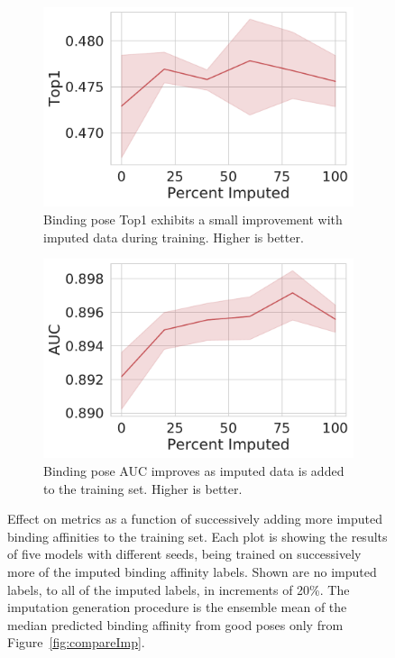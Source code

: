 \documentclass[journal=jmcmar,manuscript=article]{achemso}
\begin{document}
\begin{figure}[tbph]
    \begin{subfigure}[t]{0.48\textwidth}
        \centering
        \includegraphics[width=\linewidth]{figures/MedGOEns_addingImpTop1.pdf}
        \caption{Binding pose Top1 exhibits a small improvement with imputed data during training. Higher is better.}
    \end{subfigure}
    \hfill
    \begin{subfigure}[t]{0.48\textwidth}
        \centering
        \includegraphics[width=\linewidth]{figures/MedGOEns_addingImpAUC.pdf}
        \caption{Binding pose AUC improves as imputed data is added to the training set. Higher is better.}
    \end{subfigure}
    \caption{Effect on metrics as a function of successively adding more imputed binding affinities to the training set. Each plot is showing the results of five models with different seeds, being trained on successively more of the imputed binding affinity labels. Shown are no imputed labels, to all of the imputed labels, in increments of 20\%. The imputation generation procedure is the ensemble mean of the median predicted binding affinity from good poses only from Figure~\ref{fig:compareImp}.}
    \label{fig:medGOEnsAdding}
\end{figure}
\end{document}
